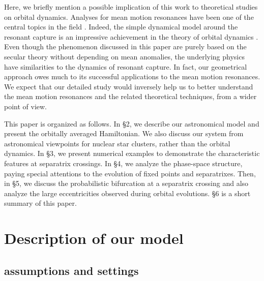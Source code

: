 \documentclass[useAMS,usenatbib,twocolumn]{mn2e}
\begin{document}
Here, we briefly mention a  possible implication of this work to theoretical studies on orbital dynamics. 
Analyses for mean motion resonances have been one of the central topics in the field \citep{goldreich1965,sinclair1972,yoder1973,henrard1983,peale1987,ssd,lithwick2012,fabrycky2014,goldreich2014,batygin2015}. Indeed, the simple dynamical model around the resonant capture is an impressive achievement in the theory of orbital dynamics \citep[see {\it e.g.}][]{henrard1982,borderies1984,ssd}.  Even though the phenomenon discussed in this paper are purely based on the secular theory without depending on mean anomalies, the underlying physics have similarities to the dynamics of resonant capture. In fact, our geometrical approach owes much to its successful applications to the mean motion resonances. We expect that our detailed study would inversely help us to better understand the mean motion resonances and the related theoretical techniques, from a wider point of view. 

This paper is organized as follows. In \S 2, we describe our astronomical model and present the orbitally averaged Hamiltonian. We also  discuss our system from astronomical viewpoints for nuclear star clusters, rather than the orbital dynamics.  In \S 3, we present numerical examples to demonstrate the characteristic features at  separatrix crossings.  In \S 4, we analyze the  phase-space structure, paying special attentions to the evolution of fixed points and separatrixes. Then, in \S 5, we discuss the probabilistic bifurcation at a separatrix crossing and also analyze the large eccentricities observed  during orbital evolutions. \S 6 is a short summary  of this paper. 










\section{Description of our model}


\subsection{assumptions and settings}
\end{document}
